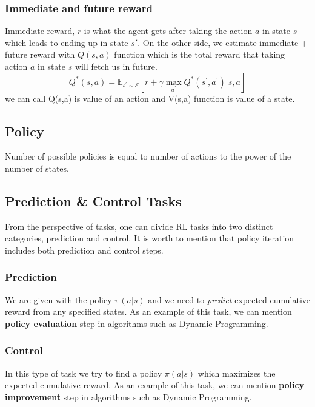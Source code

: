 \documentclass[a4paper,12pt]{article}
\begin{document}
\subsubsection{Immediate and future reward}
Immediate reward, $r$ is what the agent gets after taking the action $a$ in state $s$ which leads to ending up in state $s'$. On the other side, we estimate immediate + future reward with $Q(s,a)$ function which is the total reward that taking action $a$ in state $s$ will fetch us in future.
\begin{equation}
    Q ^ { * } ( s , a ) = \mathbb { E } _ { s ^ { \prime } \sim \mathcal { E } } \left[ r + \gamma \max _ { a ^ { \prime } } Q ^ { * } \left( s ^ { \prime } , a ^ { \prime } \right) | s , a \right]
\end{equation}
we can call Q(s,a) is value of an action and V(s,a) function is value of a state. 

\subsection{Policy}
Number of possible policies is equal to number of actions to the power of the number of states.

\subsection{Prediction \& Control Tasks}
From the perspective of tasks, one can divide RL tasks into two distinct categories, prediction and control. It is worth to mention that policy iteration includes both prediction and control steps.

\subsubsection{Prediction}
We are given with the policy $\pi(a|s)$ and we need to \textit{predict} expected cumulative reward from any specified states. As an example of this task, we can mention \textbf{policy evaluation} step in algorithms such as Dynamic Programming.

\subsubsection{Control}
In this type of task we try to find a policy $\pi(a|s)$ which maximizes the expected cumulative reward. As an example of this task, we can mention \textbf{policy improvement} step in algorithms such as Dynamic Programming.
\end{document}
